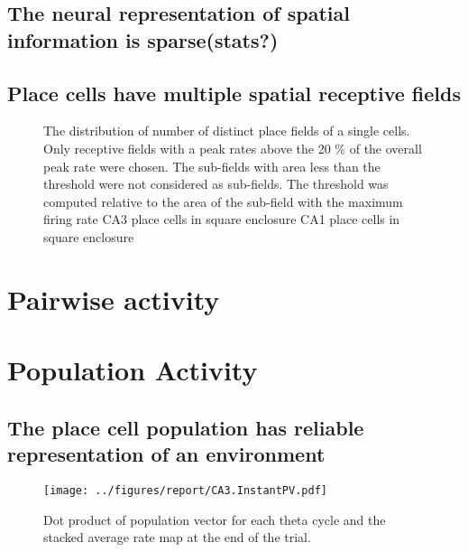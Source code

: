 \subsection[Sparse encoding]{The neural representation of spatial information is sparse(stats?)}
\subsection[Multiple Place fields]{Place cells have multiple spatial receptive fields}
\begin{figure}[htb!]
\centering
{}
\label{fig:nsubfields}
\caption[Multiple receptive fields of Place Cells]{The distribution of number of distinct place fields of a single cells. Only receptive fields with a peak rates above the 20 \% of the overall peak rate were chosen. The sub-fields with area less than the threshold were not considered as sub-fields. The threshold was computed relative to the area of the sub-field with the maximum firing rate  CA3 place cells in square enclosure  CA1 place cells in square enclosure}
\end{figure}

\section{Pairwise activity}

\section{Population Activity}
\subsection[Population activity within a fixed environment]{The place cell population has reliable representation of an environment}

\begin{figure}[htb!]
\centering
\texttt{[image: ../figures/report/CA3.InstantPV.pdf]}
\label{fig:sf1}
\caption{Dot product of population vector for each theta cycle and the stacked average rate map at the end of the trial.}
\end{figure}

